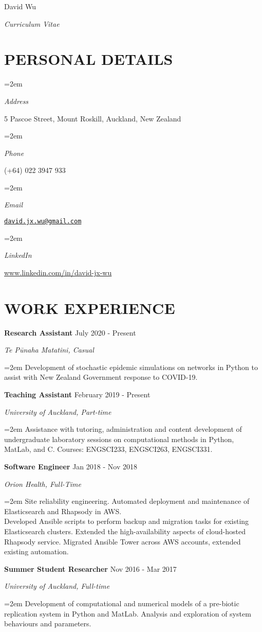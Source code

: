 \documentclass[paper=a4paper,fontsize=11pt]{scrartcl} %
\newlength{\spacebox}
\newcommand{\MyName}[1]{ %
		\Huge \usefont{T1}{phv}{b}{n} \hfill #1
		\par \normalsize \normalfont}
\newcommand{\MySlogan}[1]{ %
		\large \usefont{T1}{phv}{m}{n}\hfill \textit{#1}
		\par \normalsize \normalfont}
\newcommand{\NewPart}[1]{\section*{\uppercase{#1}}}
\newcommand{\PersonalEntry}[2]{
		\noindent\hangindent=2em\hangafter=0 %
		\parbox{\spacebox}{        %
		\textit{#1}}		       %
		\hspace{1.5em} #2 \par}    %
\newcommand{\EducationEntry}[4]{
		\noindent \textbf{#1} \hfill      %
		{#2} \par  %
		\noindent \textit{#3} \par        %
		\noindent\hangindent=2em\hangafter=0 \small #4 %
		\normalsize \par\par}
\newcommand{\WorkEntry}[4]{				  %
		\noindent \textbf{#1} \hfill      %
		{#2} \par  %
		\noindent \textit{#3} \par              %
		\noindent\hangindent=2em\hangafter=0 \small #4 %
		\normalsize \par\par}
\begin{document}
\vspace*{-1cm}
\MyName{David Wu}
\MySlogan{Curriculum Vitae}

\NewPart{Personal Details}

\PersonalEntry{Address}{5 Pascoe Street, Mount Roskill, Auckland, New Zealand}
\PersonalEntry{Phone}{(+64) 022 3947 933}
\PersonalEntry{Email}{\href{mailto:david.jx.wu@gmail.com}{\texttt{david.jx.wu@gmail.com}}}
\PersonalEntry{LinkedIn}{\url{www.linkedin.com/in/david-jx-wu}}

\NewPart{Work experience}

\WorkEntry{Research Assistant}{July 2020 - Present}{Te P\={u}naha Matatini, Casual}{Development of stochastic epidemic simulations on networks in Python to assist with New Zealand Government response to COVID-19.}

\WorkEntry{Teaching Assistant}{February 2019 - Present}{University of Auckland, Part-time}{Assistance with tutoring, administration and content development of undergraduate laboratory sessions on computational methods in Python, MatLab, and C. Courses: ENGSCI233, ENGSCI263, ENGSCI331.}

\WorkEntry{Software Engineer}{Jan 2018 - Nov 2018}{Orion Health, Full-Time}{Site reliability engineering. Automated deployment and maintenance of Elasticsearch and Rhapsody in AWS. \\Developed Ansible scripts to perform backup and migration tasks for existing Elasticsearch clusters. Extended the high-availability aspects of cloud-hosted Rhapsody service. Migrated Ansible Tower across AWS accounts, extended existing automation.}


\WorkEntry{Summer Student Researcher}{Nov 2016 - Mar 2017}{University of Auckland, Full-time}{Development of computational and numerical models of a pre-biotic replication system in Python and MatLab. Analysis and exploration of system behaviours and parameters.}
\par
\end{document}
